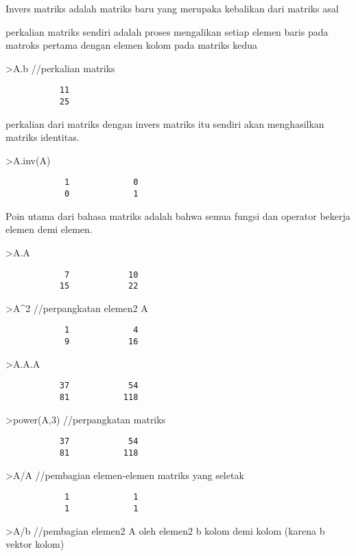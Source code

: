 \documentclass[
]{book}
\begin{document}
Invers matriks adalah matriks baru yang merupaka kebalikan dari matriks asal

perkalian matriks sendiri adalah proses mengalikan setiap elemen baris pada matroks pertama dengan elemen kolom pada matriks kedua

\textgreater A.b //perkalian matriks

\begin{verbatim}
           11 
           25 
\end{verbatim}

perkalian dari matriks dengan invers matriks itu sendiri akan menghasilkan matriks identitas.

\textgreater A.inv(A)

\begin{verbatim}
            1             0 
            0             1 
\end{verbatim}

Poin utama dari bahasa matriks adalah bahwa semua fungsi dan operator bekerja elemen demi elemen.

\textgreater A.A

\begin{verbatim}
            7            10 
           15            22 
\end{verbatim}

\textgreater A\^{}2 //perpangkatan elemen2 A

\begin{verbatim}
            1             4 
            9            16 
\end{verbatim}

\textgreater A.A.A

\begin{verbatim}
           37            54 
           81           118 
\end{verbatim}

\textgreater power(A,3) //perpangkatan matriks

\begin{verbatim}
           37            54 
           81           118 
\end{verbatim}

\textgreater A/A //pembagian elemen-elemen matriks yang seletak

\begin{verbatim}
            1             1 
            1             1 
\end{verbatim}

\textgreater A/b //pembagian elemen2 A oleh elemen2 b kolom demi kolom (karena b vektor kolom)
\end{document}

